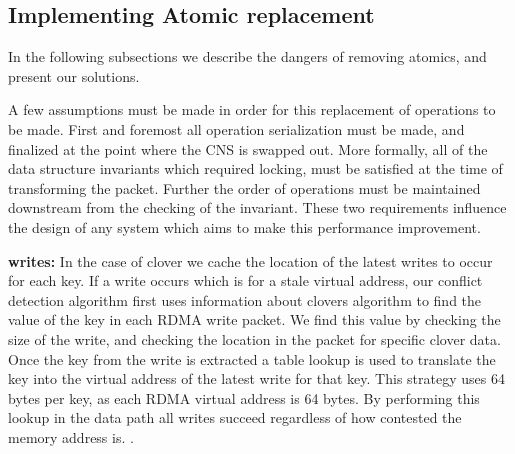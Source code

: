 \subsection{Implementing Atomic replacement}

In the
following subsections we describe the dangers of removing atomics, and present
our solutions.

A few assumptions must be made in order for this replacement of operations to be
made. First and foremost all operation serialization must be made, and finalized
at the point where the CNS is swapped out. More formally, all of the data
structure invariants which required locking, must be satisfied at the time of
transforming the packet. Further the order of operations must be maintained
downstream from the checking of the invariant. These two requirements influence
the design of any system which aims to make this performance improvement.

\textbf{writes:} In the case of clover we cache the location of the latest writes to occur for
each key. If a write occurs which is for a stale virtual address, our conflict
detection algorithm first uses information about clovers algorithm to find the
value of the key in each RDMA write packet. We find this value by checking the
size of the write, and checking the location in the packet for specific clover
data. Once the key from the write is extracted a table lookup is used to
translate the key into the virtual address of the latest write for that key.
This strategy uses 64 bytes per key, as each RDMA virtual address is 64 bytes.
By performing this lookup in the data path all writes succeed regardless of how
contested the memory address is. .

